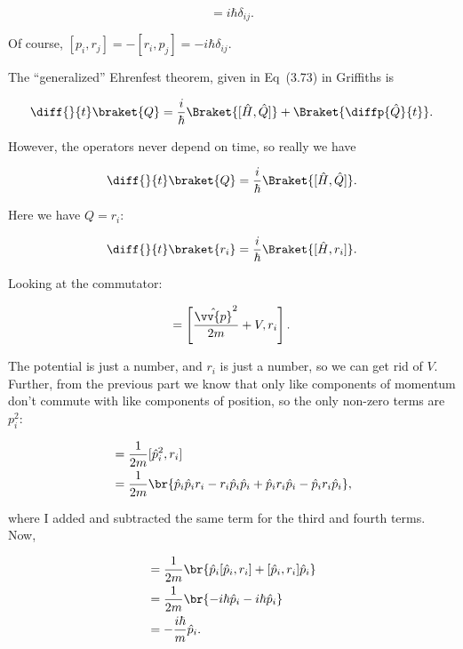 \begin{parts}
\begin{equation}
    [r_i,p_j] = i\hbar\delta_{ij}.
\end{equation}

Of course, $[p_i,r_j] = -[r_i,p_j] = -i\hbar\delta_{ij}$.




\item The ``generalized'' Ehrenfest theorem, given in Eq~(3.73) in Griffiths is 

\begin{equation}
    \diff{}{t}\braket{Q} = \frac{i}{\hbar}\Braket{[\hat{H},\hat{Q}]} + \Braket{\diffp{\hat{Q}}{t}}.
\end{equation}

However, the operators never depend on time, so really we have

\begin{equation}
    \diff{}{t}\braket{Q} = \frac{i}{\hbar}\Braket{[\hat{H},\hat{Q}]}.
\end{equation}

Here we have $Q = r_i$:

\begin{equation}
    \diff{}{t}\braket{r_i} = \frac{i}{\hbar}\Braket{[\hat{H},r_i]}.
\end{equation}

Looking at the commutator:

\begin{equation}
    [\hat{H},r_i] = \left[ \frac{\hat{\vv{p}}^2}{2m} + V, r_i \right].
\end{equation}

The potential is just a number, and $r_i$ is just a number, so we can get rid of $V$. Further, from the previous part we know that only like components of momentum don't commute with like components of position, so the only non-zero terms are $p_i^2$:

\begin{align}
    &= \frac{1}{2m}[\hat{p}_i^2,r_i] \\
    &= \frac{1}{2m}\br{\hat{p}_i\hat{p}_ir_i - r_i\hat{p}_i\hat{p}_i + \hat{p}_ir_i\hat{p}_i - \hat{p}_ir_i\hat{p}_i},
\end{align}

where I added and subtracted the same term for the third and fourth terms. Now,

\begin{align}
    &= \frac{1}{2m}\br{\hat{p}_i[\hat{p}_i,r_i] + [\hat{p}_i,r_i]\hat{p}_i} \\
    &= \frac{1}{2m}\br{-i\hbar\hat{p}_i - i\hbar\hat{p}_i} \\
    &= -\frac{i\hbar}{m}\hat{p}_i.
\end{align}


\end{parts}
